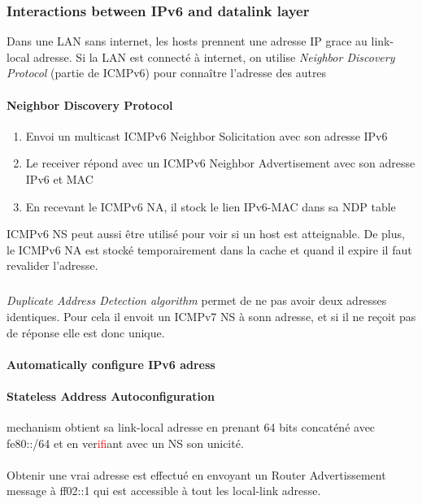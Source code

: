 \subsubsection{Interactions between IPv6 and datalink layer}

Dans une LAN sans internet, les hosts prennent une adresse IP grace au link-local adresse.
Si la LAN est connecté à internet, on utilise \textit{Neighbor Discovery Protocol} (partie de ICMPv6) pour connaître l'adresse des autres

\paragraph{Neighbor Discovery Protocol}

\begin{enumerate}
    \item Envoi un multicast ICMPv6 Neighbor Solicitation avec son adresse IPv6
    \item Le receiver répond avec un ICMPv6 Neighbor Advertisement avec son adresse IPv6 et MAC
    \item En recevant le ICMPv6 NA, il stock le lien IPv6-MAC dans sa NDP table
\end{enumerate}
ICMPv6 NS peut aussi être utilisé pour voir si un host est atteignable. De plus, le ICMPv6 NA est
stocké temporairement dans la cache et quand il expire il faut revalider l'adresse.

\subparagraph{ }
\textit{Duplicate Address Detection algorithm} permet de ne pas avoir deux adresses identiques.
Pour cela il envoit un ICMPv7 NS à sonn adresse, et si il ne reçoit pas de réponse elle est
donc unique.

\paragraph{Automatically configure IPv6 adress}
\paragraph{Stateless Address Autoconfiguration} mechanism obtient sa link-local adresse
en prenant 64 bits concaténé avec fe80::/64 et en ver\textcolor{red}{if}iant avec un NS son unicité.

\paragraph{ }
Obtenir  une   vrai  adresse  est   effectué  en  envoyant   un  Router
Advertissement  message  à  ff02::1  qui est  accessible  à  tout  les
local-link adresse.

